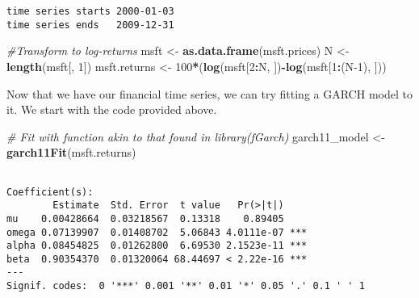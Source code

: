 \documentclass[]{book}
\newenvironment{Shaded}{\begin{snugshade}}{\end{snugshade}}
\newcommand{\CommentTok}[1]{\textcolor[rgb]{0.56,0.35,0.01}{\textit{#1}}}
\newcommand{\DecValTok}[1]{\textcolor[rgb]{0.00,0.00,0.81}{#1}}
\newcommand{\KeywordTok}[1]{\textcolor[rgb]{0.13,0.29,0.53}{\textbf{#1}}}
\newcommand{\NormalTok}[1]{#1}
\newcommand{\OperatorTok}[1]{\textcolor[rgb]{0.81,0.36,0.00}{\textbf{#1}}}
\newcommand{\StringTok}[1]{\textcolor[rgb]{0.31,0.60,0.02}{#1}}
\begin{document}
\begin{verbatim}
time series starts 2000-01-03
time series ends   2009-12-31
\end{verbatim}

\begin{Shaded}
\begin{Highlighting}[]
\CommentTok{#Transform to log-returns}
\NormalTok{msft <-}\StringTok{ }\KeywordTok{as.data.frame}\NormalTok{(msft.prices)}
\NormalTok{N <-}\StringTok{ }\KeywordTok{length}\NormalTok{(msft[, }\DecValTok{1}\NormalTok{])}
\NormalTok{msft.returns <-}\StringTok{ }\DecValTok{100}\OperatorTok{*}\NormalTok{(}\KeywordTok{log}\NormalTok{(msft[}\DecValTok{2}\OperatorTok{:}\NormalTok{N, ])}\OperatorTok{-}\KeywordTok{log}\NormalTok{(msft[}\DecValTok{1}\OperatorTok{:}\NormalTok{(N}\DecValTok{-1}\NormalTok{), ]))}
\end{Highlighting}
\end{Shaded}

Now that we have our financial time series, we can try fitting a GARCH model to it. We start with the code provided above.

\begin{Shaded}
\begin{Highlighting}[]
\CommentTok{# Fit with function akin to that found in library(fGarch)}
\NormalTok{garch11_model <-}\StringTok{ }\KeywordTok{garch11Fit}\NormalTok{(msft.returns)}
\end{Highlighting}
\end{Shaded}

\begin{verbatim}

Coefficient(s):
        Estimate  Std. Error  t value   Pr(>|t|)    
mu    0.00428664  0.03218567  0.13318    0.89405    
omega 0.07139907  0.01408702  5.06843 4.0111e-07 ***
alpha 0.08454825  0.01262800  6.69530 2.1523e-11 ***
beta  0.90354370  0.01320064 68.44697 < 2.22e-16 ***
---
Signif. codes:  0 '***' 0.001 '**' 0.01 '*' 0.05 '.' 0.1 ' ' 1
\end{verbatim}
\end{document}
